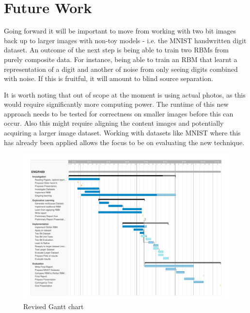 

\chapter{Future Work}\label{C:Future Work}

Going forward it will be important to move from working with two bit images back up to larger images with non-toy models - i.e. the MNIST handwritten digit dataset.
An outcome of the next step is being able to train two RBMs from purely composite data. For instance, being able to train an RBM that learnt a representation of a digit and another of noise from only seeing digits combined with noise. If this is fruitful, it will amount to blind source separation.

It is worth noting that out of scope at the moment is using actual photos, as this would require significantly more computing power. The runtime of this new approach needs to be tested for correctness on smaller images before this can occur. Also this might require aligning the content images and potentially acquiring a larger image dataset. Working with datasets like MNIST where this has already been applied allows the focus to be on evaluating the new technique.

\begin{figure}
  \begin{center}
    \includegraphics[width=1\textwidth]{Assets/gantt}
    \caption{Revised Gantt chart}
   \label{F:gantt}
   \end{center}
\end{figure}
